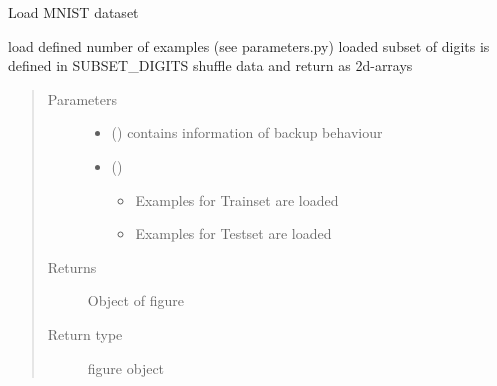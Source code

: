 \documentclass[letterpaper,10pt,english]{sphinxmanual}
\begin{document}

\begin{fulllineitems}
\label{\detokenize{SpikingConvNet:SpikingConvNet.utils.load_MNIST_digits_shuffled}}
Load MNIST dataset

load defined number of examples (see parameters.py)
loaded subset of digits is defined in SUBSET\_DIGITS
shuffle data and return as 2d-arrays
\begin{quote}\begin{description}
\item[{Parameters}] \leavevmode\begin{itemize}
\item {} 
 () \textendash{} contains information of backup behaviour

\item {} 
 () \textendash{}
\begin{itemize}
\item {} 
 Examples for Trainset are loaded

\item {} 
 Examples for Testset are loaded

\end{itemize}

\end{itemize}

\item[{Returns}] \leavevmode
{} \textendash{} Object of figure

\item[{Return type}] \leavevmode
figure object

\end{description}\end{quote}

\end{fulllineitems}

\end{document}
